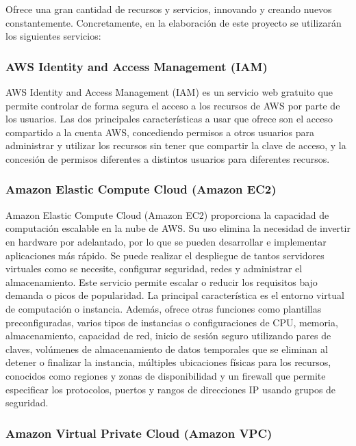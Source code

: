 Ofrece una gran cantidad de recursos y servicios, innovando y creando nuevos constantemente. Concretamente, en la elaboración de este proyecto se utilizarán los siguientes servicios:

\subsubsection{AWS Identity and Access Management (IAM)}

AWS Identity and Access Management (IAM) es un servicio web gratuito que permite controlar de forma segura el acceso a los recursos de AWS por parte de los usuarios. Las dos principales características a usar que ofrece son el acceso compartido a la cuenta AWS, concediendo permisos a otros usuarios para administrar y utilizar los recursos sin tener que compartir la clave de acceso, y la concesión de permisos diferentes a distintos usuarios para diferentes recursos.

\subsubsection{Amazon Elastic Compute Cloud (Amazon EC2)}

Amazon Elastic Compute Cloud (Amazon EC2) proporciona la capacidad de computación escalable en la nube de AWS. Su uso elimina la necesidad de invertir en hardware por adelantado, por lo que se pueden desarrollar e implementar aplicaciones más rápido. Se puede realizar el despliegue de tantos servidores virtuales como se necesite, configurar seguridad, redes y administrar el almacenamiento. Este servicio permite escalar o reducir los requisitos bajo demanda o picos de popularidad. La principal característica es el entorno virtual de computación o instancia. Además, ofrece otras funciones como plantillas preconfiguradas, varios tipos de instancias o configuraciones de CPU, memoria, almacenamiento, capacidad de red, inicio de sesión seguro utilizando pares de claves, volúmenes de almacenamiento de datos temporales que se eliminan al detener o finalizar la instancia, múltiples ubicaciones físicas para los recursos, conocidos como regiones y zonas de disponibilidad y un firewall que permite especificar los protocolos, puertos y rangos de direcciones IP usando grupos de seguridad.

\subsubsection{Amazon Virtual Private Cloud (Amazon VPC)}

